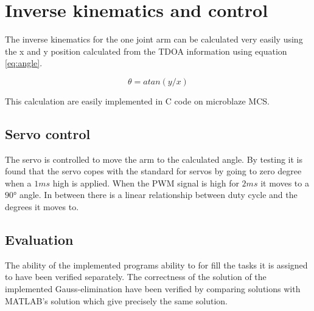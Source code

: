 \section{Inverse kinematics and control }
\label{sec:mechanics_kinematics}
The inverse kinematics for the one joint arm can be calculated very easily using the x and y position calculated from the TDOA information using equation \ref{eq:angle}.

\begin{equation}
\theta = atan(y/x)
\label{eq:angle}
\end{equation}

This calculation are easily implemented in C code on microblaze MCS.

\subsection{Servo control}
The servo is controlled to move the arm to the calculated angle. By testing it is found that the servo copes with the standard for servos by going to zero degree when a $1\si{ms}$ high is applied. When the PWM signal is high for $2\si{ms}$ it moves to a $90\si{\degree}$ angle. In between there is a linear relationship between duty cycle and the degrees it moves to.
%
\subsection{Evaluation}
The ability of the implemented programs ability to for fill the tasks it is assigned to have been verified separately. The correctness of the solution of the implemented Gauss-elimination have been verified by comparing solutions with MATLAB's solution which give precisely the same solution.